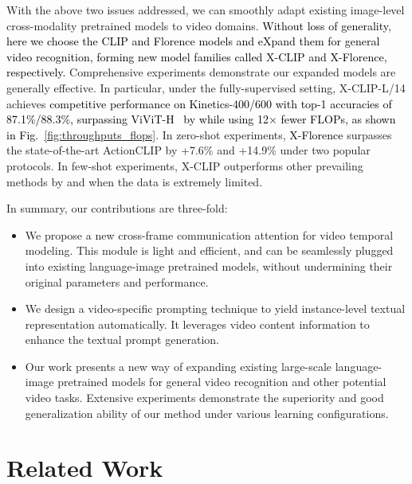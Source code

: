 \documentclass[runningheads]{llncs}
\begin{document}
With the above two issues addressed, we can smoothly adapt existing image-level cross-modality pretrained models to video domains. \textcolor{black}{Without loss of generality, here we choose the CLIP \cite{clip} and Florence \cite{florence} models and eXpand them for general video recognition, forming new model families called X-CLIP and X-Florence, respectively.} Comprehensive experiments demonstrate our expanded models are generally effective. In particular, under the fully-supervised setting, X-CLIP-L/14 achieves \textcolor{black}{competitive performance on Kinetics-400/600 with top-1 accuracies of 87.1\%/88.3\%, surpassing ViViT-H~\cite{arnab2021vivit} by  while using 12× fewer FLOPs, as shown in Fig.~\ref{fig:throughputs_flops}}. In zero-shot experiments, \textcolor{black}{X-Florence} surpasses the state-of-the-art ActionCLIP \cite{wang2021actionclip} by +7.6\% and +14.9\% under two popular protocols. In few-shot experiments, X-CLIP outperforms other prevailing methods by  and  when the data is extremely limited.

In summary, our contributions are three-fold: 
\begin{itemize}
    \item We propose a new cross-frame communication attention for video temporal modeling. This module is light and efficient, and can be seamlessly plugged into existing language-image pretrained models, without undermining their original parameters and performance.
    \item We design a video-specific  prompting technique to yield instance-level textual representation automatically. It leverages video content information to enhance the textual prompt generation. 
    \item Our work presents a new way of expanding existing large-scale language-image pretrained models for general video recognition and other potential video tasks. Extensive experiments demonstrate the superiority and good generalization ability of our method under various learning configurations. 
\end{itemize}

\section{Related Work}
\end{document}
